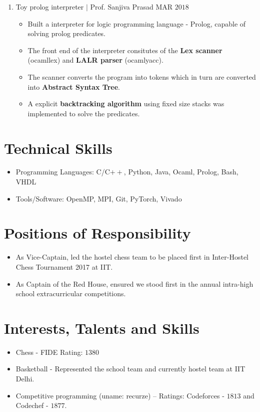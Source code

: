 \documentclass{article}
\begin{document}
\begin{enumerate}
\item
    Toy prolog interpreter
    $\mid$
    Prof. Sanjiva Prasad
    \hfill
    MAR $2018$

    \begin{itemize}[noitemsep,nolistsep]
        \item
            Built a interpreter for logic programming language - Prolog, capable
            of solving prolog predicates.
        \item
            The front end of the interpreter consitutes of the \textbf{Lex
            scanner} (ocamllex) and \textbf{LALR parser} (ocamlyacc).
        \item
            The scanner converts the program into tokens which in turn are
            converted into \textbf{Abstract Syntax Tree}.
        \item
            A explicit \textbf{backtracking algorithm} using fixed size stacks
            was implemented to solve the predicates.
    \end{itemize}
\end{enumerate}

\section*{Technical Skills}
\begin{itemize}[noitemsep,nolistsep]
    \item
        Programming Languages: C/C$++$, Python, Java, Ocaml, Prolog, Bash, VHDL
    \item
        Tools/Software: OpenMP, MPI, Git, PyTorch, Vivado
\end{itemize}

\section*{Positions of Responsibility}
\begin{itemize}[noitemsep,nolistsep]
    \item
        As Vice-Captain, led the hostel chess team to be placed first in
        Inter-Hostel Chess Tournament 2017 at IIT.
    \item
        As Captain of the Red House, ensured we stood first in the annual
        intra-high school extracurricular competitions.
\end{itemize}

\section*{Interests, Talents and Skills}
\begin{itemize}[noitemsep,nolistsep]
    \item
        Chess - FIDE Rating: $1380$
    \item
        Basketball - Represented the school team and currently hostel team at
        IIT Delhi.
    \item
        Competitive programming (uname: recurze) – Ratings: Codeforces - $1813$
        and Codechef - $1877$.
\end{itemize}
\end{document}
